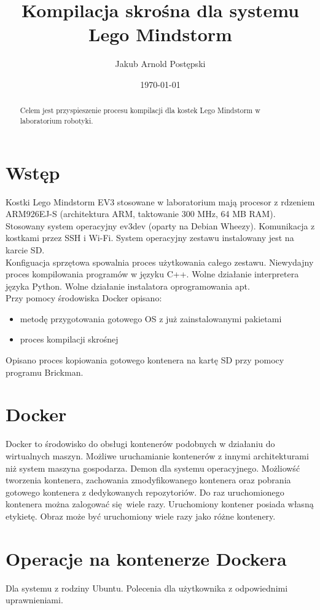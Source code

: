 \documentclass{article}
\begin{document}
\title{Kompilacja skrośna dla systemu Lego Mindstorm}   
\author{Jakub Arnold Postępski} 
\date{\today}

\maketitle

\begin{abstract}
	Celem jest przyspieszenie procesu kompilacji dla kostek Lego Mindstorm w laboratorium robotyki. 
\end{abstract}

\section{Wstęp}
	Kostki Lego Mindstorm EV3 stosowane w laboratorium mają procesor z rdzeniem ARM926EJ-S (architektura ARM, taktowanie 300 MHz, 64 MB RAM). Stosowany system operacyjny ev3dev (oparty na Debian Wheezy). Komunikacja z kostkami przez SSH i Wi-Fi. System operacyjny zestawu instalowany jest na karcie SD.\\
	Konfiguacja sprzętowa spowalnia proces użytkowania całego zestawu. Niewydajny proces kompilowania programów w języku C++. Wolne działanie interpretera języka Python. Wolne działanie instalatora oprogramowania apt.\\
	Przy pomocy środowiska Docker opisano:
	\begin{itemize}
		\item metodę przygotowania gotowego OS z już zainstalowanymi pakietami
		\item proces kompilacji skrośnej
	\end{itemize}
	Opisano proces kopiowania gotowego kontenera na kartę SD przy pomocy programu Brickman.
	
\section{Docker}
Docker to środowisko do obsługi kontenerów podobnych w działaniu do wirtualnych maszyn. Możliwe uruchamianie kontenerów z innymi architekturami niż system maszyna gospodarza. Demon dla systemu operacyjnego. Możliowść tworzenia kontenera, zachowania zmodyfikowanego kontenera oraz pobrania gotowego kontenera z dedykowanych repozytoriów. Do raz uruchomionego kontenera można zalogować się wiele razy. Uruchomiony kontener posiada własną etykietę. Obraz może być uruchomiony wiele razy jako różne kontenery.

\section{Operacje na kontenerze Dockera}
Dla systemu z rodziny Ubuntu. Polecenia dla użytkownika z odpowiednimi uprawnieniami.
\end{document}
